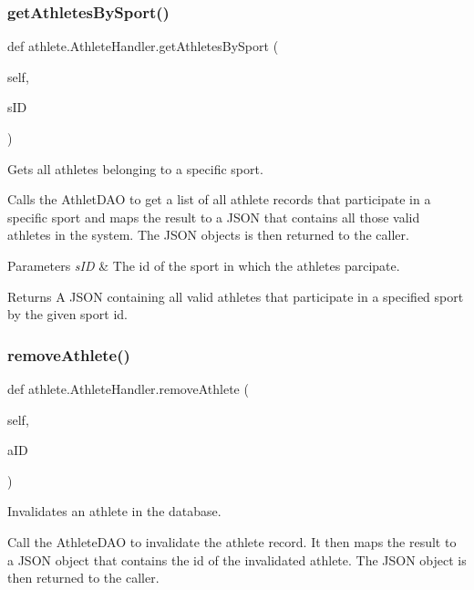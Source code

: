 \subsubsection{\texorpdfstring{get\+Athletes\+By\+Sport()}{getAthletesBySport()}}
{\footnotesize\ttfamily def athlete.\+Athlete\+Handler.\+get\+Athletes\+By\+Sport (\begin{DoxyParamCaption}\item[{}]{self,  }\item[{}]{s\+ID }\end{DoxyParamCaption})}



Gets all athletes belonging to a specific sport. 

Calls the Athlet\+D\+AO to get a list of all athlete records that participate in a specific sport and maps the result to a J\+S\+ON that contains all those valid athletes in the system. The J\+S\+ON objects is then returned to the caller.


\begin{DoxyParams}{Parameters}
{\em s\+ID} & The id of the sport in which the athletes parcipate.\\
\hline
\end{DoxyParams}
\begin{DoxyReturn}{Returns}
A J\+S\+ON containing all valid athletes that participate in a specified sport by the given sport id. 
\end{DoxyReturn}
\mbox{\label{classathlete_1_1_athlete_handler_afb7403e77cd06eef441c69e77c95e276}} 
\subsubsection{\texorpdfstring{remove\+Athlete()}{removeAthlete()}}
{\footnotesize\ttfamily def athlete.\+Athlete\+Handler.\+remove\+Athlete (\begin{DoxyParamCaption}\item[{}]{self,  }\item[{}]{a\+ID }\end{DoxyParamCaption})}



Invalidates an athlete in the database. 

Call the Athlete\+D\+AO to invalidate the athlete record. It then maps the result to a J\+S\+ON object that contains the id of the invalidated athlete. The J\+S\+ON object is then returned to the caller.


